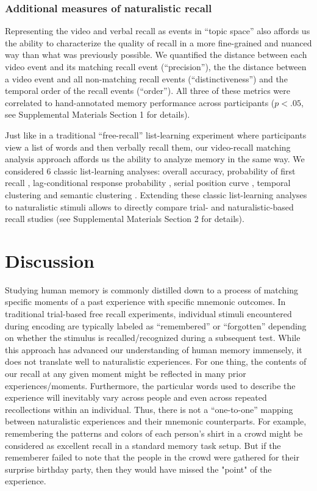 \documentclass{article}
\begin{document}
\subsubsection{Additional measures of naturalistic recall}
Representing the video and verbal recall as events in ``topic space'' also affords us the ability to characterize the quality of recall in a more fine-grained and nuanced way than what was previously possible. We quantified the distance between each video event and its matching recall event (``precision''), the the distance between a video event and all non-matching recall events (``distinctiveness'') and the temporal order of the recall events (``order''). All three of these metrics were correlated to hand-annotated memory performance across participants ($p<.05$, see Supplemental Materials Section 1 for details).

Just like in a traditional ``free-recall'' list-learning experiment where participants view a list of words and then verbally recall them, our video-recall matching analysis approach affords us the ability to analyze memory in the same way. We considered 6 classic list-learning analyses: overall accuracy, probability of first recall \citep{Hoga75, HowaKaha99, Lami99}, lag-conditional response probability \citep{Kaha96, HowaKaha99}, serial position curve \citep{Murd62a}, temporal clustering and semantic clustering \citep{HowaKaha02, PolyEtal09}. Extending these classic list-learning analyses to naturalistic stimuli allows to directly compare trial- and naturalistic-based recall studies (see Supplemental Materials Section 2 for details).

\section*{Discussion}
\label{sec:discussion}
Studying human memory is commonly distilled down to a process of matching specific moments of a past experience with specific mnemonic outcomes.  In traditional trial-based free recall experiments, individual stimuli encountered during encoding are typically labeled as ``remembered'' or ``forgotten'' depending on whether the stimulus is recalled/recognized during a subsequent test. While this approach has advanced our understanding of human memory immensely, it does not translate well to naturalistic experiences. For one thing, the contents of our recall at any given moment might be reflected in many prior experiences/moments. Furthermore, the particular words used to describe the experience will inevitably vary across people and even across repeated recollections within an individual. Thus, there is not a ``one-to-one'' mapping between naturalistic experiences and their mnemonic counterparts. For example, remembering the patterns and colors of each person's shirt in a crowd might be considered as excellent recall in a standard memory task setup. But if the rememberer failed to note that the people in the crowd were gathered for their surprise birthday party, then they would have missed the "point" of the experience.
\end{document}
